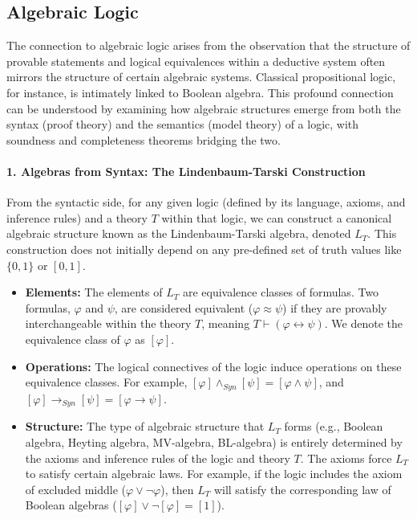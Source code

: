 \subsection{Algebraic Logic}

The connection to algebraic logic arises from the observation that the structure of provable statements and logical equivalences within a deductive system often mirrors the structure of certain algebraic systems. Classical propositional logic, for instance, is intimately linked to Boolean algebra. This profound connection can be understood by examining how algebraic structures emerge from both the syntax (proof theory) and the semantics (model theory) of a logic, with soundness and completeness theorems bridging the two.

\paragraph{1. Algebras from Syntax: The Lindenbaum-Tarski Construction}

From the syntactic side, for any given logic (defined by its language, axioms, and inference rules) and a theory $T$ within that logic, we can construct a canonical algebraic structure known as the Lindenbaum-Tarski algebra, denoted $L_T$. This construction does not initially depend on any pre-defined set of truth values like $\{0,1\}$ or $[0,1]$.

\begin{itemize}
\item \textbf{Elements:} The elements of $L_T$ are equivalence classes of formulas. Two formulas, $\varphi$ and $\psi$, are considered equivalent ($\varphi \approx \psi$) if they are provably interchangeable within the theory $T$, meaning $T \vdash (\varphi \leftrightarrow \psi)$. We denote the equivalence class of $\varphi$ as $[\varphi]$.
\item \textbf{Operations:} The logical connectives of the logic induce operations on these equivalence classes. For example, $[\varphi] \wedge_{Syn} [\psi] = [\varphi \wedge \psi]$, and $[\varphi] \to_{Syn} [\psi] = [\varphi \to \psi]$.
\item \textbf{Structure:} The type of algebraic structure that $L_T$ forms (e.g., Boolean algebra, Heyting algebra, MV-algebra, BL-algebra) is entirely determined by the axioms and inference rules of the logic and theory $T$. The axioms force $L_T$ to satisfy certain algebraic laws. For example, if the logic includes the axiom of excluded middle ($\varphi \vee \neg \varphi$), then $L_T$ will satisfy the corresponding law of Boolean algebras ($[\varphi] \vee \neg [\varphi] = [1]$).
\end{itemize}

